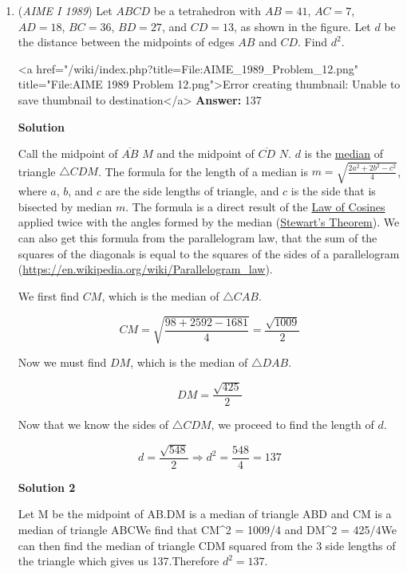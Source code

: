 \begin{enumerate}
	\item (\textit{AIME I 1989}) Let $ABCD$ be a tetrahedron with $AB=41$, $AC=7$, $AD=18$, $BC=36$, $BD=27$, and $CD=13$, as shown in the figure. Let $d$ be the distance between the midpoints of edges $AB$ and $CD$. Find $d^{2}$.


 <a href="/wiki/index.php?title=File:AIME\_1989\_Problem\_12.png" title="File:AIME 1989 Problem 12.png">Error creating thumbnail: Unable to save thumbnail to destination</a>
 \textbf{Answer: }137



\textbf{Solution}

Call the midpoint of $\overline{AB}$ $M$ and the midpoint of $\overline{CD}$ $N$. $d$ is the \href{https://artofproblemsolving.com/wiki/index.php?title=Median}{median} of triangle $\triangle CDM$. The formula for the length of a median is $m=\sqrt{\frac{2a^2+2b^2-c^2}{4}}$, where $a$, $b$, and $c$ are the side lengths of triangle, and $c$ is the side that is bisected by median $m$. The formula is a direct result of the \href{https://artofproblemsolving.com/wiki/index.php?title=Law\_of\_Cosines}{Law of Cosines} applied twice with the angles formed by the median (\href{https://artofproblemsolving.com/wiki/index.php?title=Stewart\%27s\_Theorem}{Stewart's Theorem}). We can also get this formula from the parallelogram law, that the sum of the squares of the diagonals is equal to the squares of the sides of a parallelogram (\href{https://en.wikipedia.org/wiki/Parallelogram\_law}{https://en.wikipedia.org/wiki/Parallelogram\_law}).

 We first find $CM$, which is the median of $\triangle CAB$.

 
 \[CM=\sqrt{\frac{98+2592-1681}{4}}=\frac{\sqrt{1009}}{2}\]

 Now we must find $DM$, which is the median of $\triangle DAB$.

 
 \[DM=\frac{\sqrt{425}}{2}\]

 Now that we know the sides of $\triangle CDM$, we proceed to find the length of $d$.

 
 \[d=\frac{\sqrt{548}}{2} \Longrightarrow d^2=\frac{548}{4}=\boxed{137}\]




\textbf{Solution 2}

Let M be the midpoint of AB.DM is a median of triangle ABD and CM is a median of triangle ABCWe find that CM\textasciicircum{}2 = 1009/4 and DM\textasciicircum{}2 = 425/4We can then find the median of triangle CDM squared from the 3 side lengths of the triangle which gives us 137.Therefore \(d^2 = \boxed{137}.\)


\end{enumerate}
